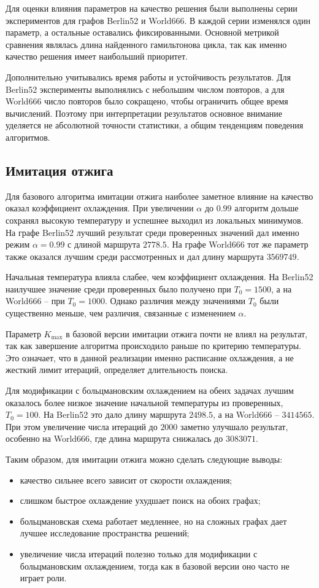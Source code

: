 \documentclass[12pt,a4paper]{article}
\begin{document}
Для оценки влияния параметров на качество решения были выполнены серии экспериментов
для графов Berlin52 и World666. В каждой серии изменялся один параметр, а остальные
оставались фиксированными. Основной метрикой сравнения являлась длина найденного
гамильтонова цикла, так как именно качество решения имеет наибольший приоритет.

Дополнительно учитывались время работы и устойчивость результатов. Для Berlin52
эксперименты выполнялись с небольшим числом повторов, а для World666 число повторов
было сокращено, чтобы ограничить общее время вычислений. Поэтому при интерпретации
результатов основное внимание уделяется не абсолютной точности статистики, а общим
тенденциям поведения алгоритмов.

\subsection{Имитация отжига}

Для базового алгоритма имитации отжига наиболее заметное влияние на качество оказал
коэффициент охлаждения. При увеличении $\alpha$ до $0.99$ алгоритм дольше сохранял
высокую температуру и успешнее выходил из локальных минимумов. На графе Berlin52
лучший результат среди проверенных значений дал именно режим $\alpha = 0.99$ с длиной
маршрута $2778.5$. На графе World666 тот же параметр также оказался лучшим среди
рассмотренных и дал длину маршрута $3569749$.

Начальная температура влияла слабее, чем коэффициент охлаждения. На Berlin52
наилучшее значение среди проверенных было получено при $T_0 = 1500$, а на World666 --
при $T_0 = 1000$. Однако различия между значениями $T_0$ были существенно меньше, чем
различия, связанные с изменением $\alpha$.

Параметр $K_{\max}$ в базовой версии имитации отжига почти не влиял на результат,
так как завершение алгоритма происходило раньше по критерию температуры. Это означает,
что в данной реализации именно расписание охлаждения, а не жесткий лимит итераций,
определяет длительность поиска.

Для модификации с больцмановским охлаждением на обеих задачах лучшим оказалось более
низкое значение начальной температуры из проверенных, $T_0 = 100$. На Berlin52 это
дало длину маршрута $2498.5$, а на World666 -- $3414565$. При этом увеличение числа
итераций до $2000$ заметно улучшало результат, особенно на World666, где длина маршрута
снижалась до $3083071$.

Таким образом, для имитации отжига можно сделать следующие выводы:
\begin{itemize}
    \item качество сильнее всего зависит от скорости охлаждения;
    \item слишком быстрое охлаждение ухудшает поиск на обоих графах;
    \item больцмановская схема работает медленнее, но на сложных графах дает лучшее
    исследование пространства решений;
    \item увеличение числа итераций полезно только для модификации с больцмановским
    охлаждением, тогда как в базовой версии оно часто не играет роли.
\end{itemize}
\end{document}
